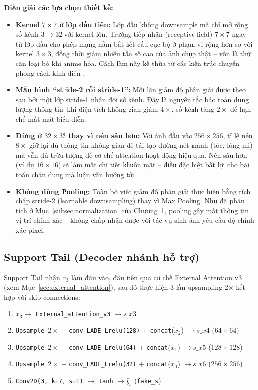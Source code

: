 \textbf{Diễn giải các lựa chọn thiết kế:}

\begin{itemize}
    \item \textbf{Kernel $7 \times 7$ ở lớp đầu tiên:} Lớp đầu không downsample mà chỉ mở rộng số kênh $3 \rightarrow 32$ với kernel lớn. Trường tiếp nhận (receptive field) $7 \times 7$ ngay từ lớp đầu cho phép mạng nắm bắt kết cấu cục bộ ở phạm vi rộng hơn so với kernel $3\times3$, đồng thời giảm nhiễu tần số cao của ảnh chụp thật -- vốn là thứ cần loại bỏ khi anime hóa. Cách làm này kế thừa từ các kiến trúc chuyển phong cách kinh điển \cite{Johnson2016}.
    \item \textbf{Mẫu hình ``stride-2 rồi stride-1'':} Mỗi lần giảm độ phân giải được theo sau bởi một lớp stride-1 nhân đôi số kênh. Đây là nguyên tắc bảo toàn dung lượng thông tin: khi diện tích không gian giảm $4\times$, số kênh tăng $2\times$ để hạn chế mất mát biểu diễn.
    \item \textbf{Dừng ở $32 \times 32$ thay vì nén sâu hơn:} Với ảnh đầu vào $256\times256$, tỉ lệ nén $8\times$ giữ lại đủ thông tin không gian để tái tạo đường nét mảnh (tóc, lông mi) mà vẫn đủ trừu tượng để cơ chế attention hoạt động hiệu quả. Nén sâu hơn (ví dụ $16\times16$) sẽ làm mất chi tiết khuôn mặt -- điều đặc biệt bất lợi cho bài toán chân dung mà luận văn hướng tới.
    \item \textbf{Không dùng Pooling:} Toàn bộ việc giảm độ phân giải thực hiện bằng tích chập stride-2 (learnable downsampling) thay vì Max Pooling. Như đã phân tích ở Mục~\ref{subsec:normalization} của Chương~1, pooling gây mất thông tin vị trí chính xác -- không chấp nhận được với tác vụ sinh ảnh yêu cầu độ chính xác pixel.
\end{itemize}

\subsection{Support Tail (Decoder nhánh hỗ trợ)}
\label{subsec:support_tail}

Support Tail nhận $x_3$ làm đầu vào, đầu tiên qua cơ chế External Attention v3 (xem Mục~\ref{sec:external_attention}), sau đó thực hiện 3 lần upsampling 2× kết hợp với skip connections:

\begin{enumerate}
    \item $x_3 \to$ \texttt{External\_attention\_v3} $\to s\_x3$
    \item \texttt{Upsample $2\times$} + \texttt{conv\_LADE\_Lrelu(128)} + \texttt{concat}($x_2$) $\to s\_x4$ ($64 \times 64$)
    \item \texttt{Upsample $2\times$} + \texttt{conv\_LADE\_Lrelu(64)} + \texttt{concat}($x_1$) $\to s\_x5$ ($128 \times 128$)
    \item \texttt{Upsample $2\times$} + \texttt{conv\_LADE\_Lrelu(32)} + \texttt{concat}($x_0$) $\to s\_x6$ ($256 \times 256$)
    \item \texttt{Conv2D(3, k=7, s=1)} $\to$ \texttt{tanh} $\to \widehat{y}_s$ (\texttt{fake\_s})
\end{enumerate}

